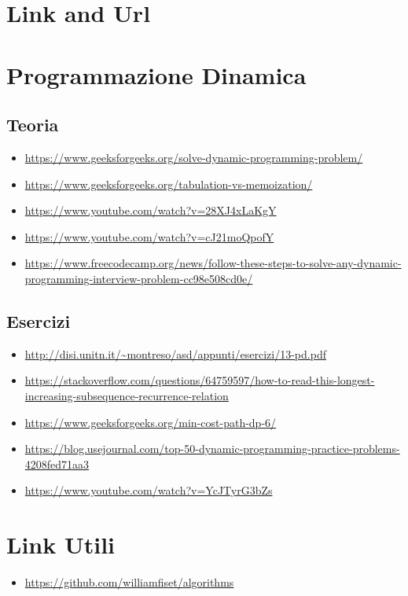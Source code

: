 \documentclass{article}
\begin{document}
\section{Link and Url}
\section{Programmazione Dinamica}
\subsection{Teoria}
\begin{itemize}
        \item\url{https://www.geeksforgeeks.org/solve-dynamic-programming-problem/}
        \item\url{https://www.geeksforgeeks.org/tabulation-vs-memoization/}
        \item\url{https://www.youtube.com/watch?v=28XJ4xLaKgY}    
        \item\url{https://www.youtube.com/watch?v=cJ21moQpofY}
        \item\url{https://www.freecodecamp.org/news/follow-these-steps-to-solve-any-dynamic-programming-interview-problem-cc98e508cd0e/}
\end{itemize}
\subsection{Esercizi}
\begin{itemize}
        \item\url{http://disi.unitn.it/~montreso/asd/appunti/esercizi/13-pd.pdf}
        \item\url{https://stackoverflow.com/questions/64759597/how-to-read-this-longest-increasing-subsequence-recurrence-relation}
        \item\url{https://www.geeksforgeeks.org/min-cost-path-dp-6/}
        \item\url{https://blog.usejournal.com/top-50-dynamic-programming-practice-problems-4208fed71aa3}
        \item\url{https://www.youtube.com/watch?v=YcJTyrG3bZs}    
\end{itemize}
\section{Link Utili}
\begin{itemize}
    \item \url{https://github.com/williamfiset/algorithms}
\end{itemize}
\end{document}
